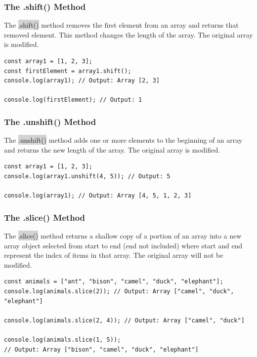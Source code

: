 \documentclass[11pt]{article}
\begin{document}
\subsubsection{The .shift() Method}
The \colorbox{lightgray}{.shift()} method removes the first element from an array and returns that removed element. This method changes the length of the array. The original array is modified. 
\begin{lstlisting}
const array1 = [1, 2, 3];
const firstElement = array1.shift();
console.log(array1); // Output: Array [2, 3]

console.log(firstElement); // Output: 1
\end{lstlisting}

\subsubsection{The .unshift() Method}
The \colorbox{lightgray}{.unshift()} method adds one or more elements to the beginning of an array and returns the new length of the array. The original array is modified. 
\begin{lstlisting}
const array1 = [1, 2, 3];
console.log(array1.unshift(4, 5)); // Output: 5

console.log(array1); // Output: Array [4, 5, 1, 2, 3]
\end{lstlisting}

\subsubsection{The .slice() Method}
The \colorbox{lightgray}{.slice()} method returns a shallow copy of a portion of an array into a new array object selected from start to end (end not included) where start and end represent the index of items in that array. The original array will not be modified.
\begin{lstlisting}
const animals = ["ant", "bison", "camel", "duck", "elephant"];
console.log(animals.slice(2)); // Output: Array ["camel", "duck", "elephant"]

console.log(animals.slice(2, 4)); // Output: Array ["camel", "duck"]

console.log(animals.slice(1, 5)); 
// Output: Array ["bison", "camel", "duck", "elephant"]
\end{lstlisting}
\end{document}
